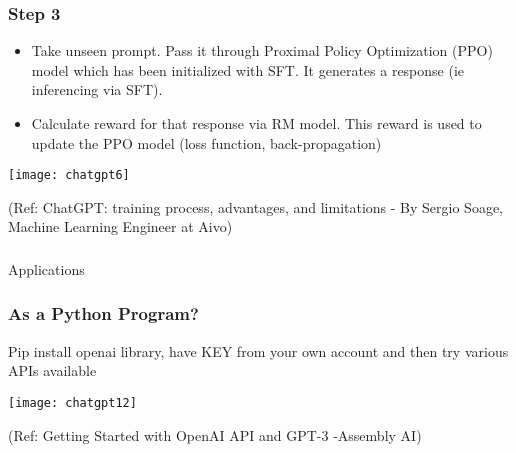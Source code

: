 

			
			
			


\begin{frame}[fragile]\frametitle{Step 3}

\begin{itemize}
\item Take unseen prompt. Pass it through Proximal Policy Optimization (PPO) model which has been initialized with SFT. It generates a response (ie inferencing via SFT).
\item Calculate reward for that response via RM model. This reward is used to update the PPO model (loss function, back-propagation)
\end{itemize}	 

			\begin{center}
			\texttt{[image: chatgpt6]}
			
			\end{center}		
			
			{\tiny (Ref: ChatGPT: training process, advantages, and limitations - By Sergio Soage, Machine Learning Engineer at Aivo)}
			
\end{frame}

\begin{frame}[fragile]\frametitle{}
\begin{center}
{\Large Applications}
\end{center}
\end{frame}

\begin{frame}[fragile]\frametitle{As a Python Program?}
Pip install openai library, have KEY from your own account and then try various APIs available

			\begin{center}
			\texttt{[image: chatgpt12]}
			
			\end{center}		
			
			{\tiny (Ref: Getting Started with OpenAI API and GPT-3 -Assembly AI)}
			

\end{frame}

